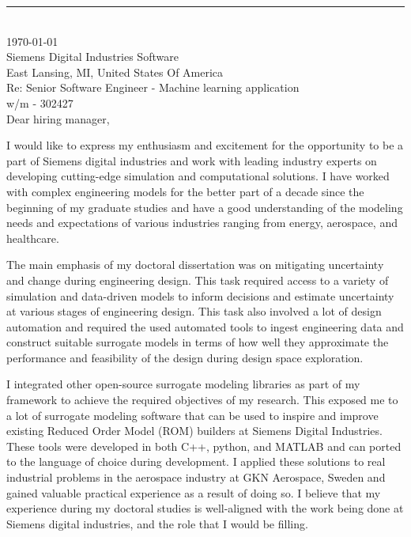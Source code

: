 \documentclass[12pt]{article} %
\begin{document}
\medskip %
\rule[0pt]{\textwidth}{1pt}\\
\today\\[6pt]
Siemens Digital Industries Software\\
East Lansing, MI, United States Of America\\
Re: Senior Software Engineer - Machine learning application\\
w/m - 302427\\[6pt] \medskip
Dear hiring manager,

\medskip %
I would like to express my enthusiasm and excitement for the opportunity to be a part of Siemens digital industries and work with leading industry experts on developing cutting-edge simulation and computational solutions. I have worked with complex engineering models for the better part of a decade since the beginning of my graduate studies and have a good understanding of the modeling needs and expectations of various industries ranging from energy, aerospace, and healthcare.

\medskip %

The main emphasis of my doctoral dissertation was on mitigating uncertainty and change during engineering design. This task required access to a variety of simulation and data-driven models to inform decisions and estimate uncertainty at various stages of engineering design. This task also involved a lot of design automation and required the used automated tools to ingest engineering data and construct suitable surrogate models in terms of how well they approximate the performance and feasibility of the design during design space exploration.

\medskip %

I integrated other open-source surrogate modeling libraries as part of my framework to achieve the required objectives of my research. This exposed me to a lot of surrogate modeling software that can be used to inspire and improve existing Reduced Order Model (ROM) builders at Siemens Digital Industries. These tools were developed in both C++, python, and MATLAB and can ported to the language of choice during development. I applied these solutions to real industrial problems in the aerospace industry at GKN Aerospace, Sweden and gained valuable practical experience as a result of doing so. I believe that my experience during my doctoral studies is well-aligned with the work being done at Siemens digital industries, and the role that I would be filling.
\end{document}
